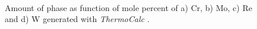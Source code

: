 \begin{figure}[H]
  \centering
   \\
  \caption{Amount of phase as function of mole percent of a) Cr, b) Mo, c) Re and d) W generated with \textit{ThermoCalc} \citep{thermocalc}.}
  \label{fig:diagram04}
\end{figure}